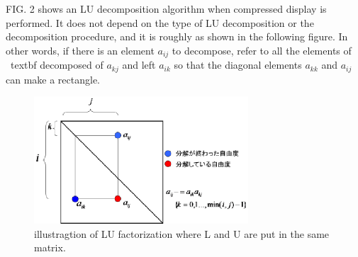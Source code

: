 FIG. 2 shows an LU decomposition algorithm when compressed display is performed. It does not depend on the type of LU decomposition or the decomposition procedure, and it is roughly as shown in the following figure. In other words, if there is an element $a_{ij}$ to decompose, refer to all the elements of \ textbf {decomposed} of $a_{kj}$ and left $a_{ik}$ so that the diagonal elements $a_{kk}$ and $a_{ij}$ can make a rectangle.

\begin{figure}
\begin{center}
\includegraphics[width=80mm]{images/decomp_matrix.eps}
\caption{illustragtion of LU factorization where L and U are put in the same matrix.}
\end{center}
\end{figure}




